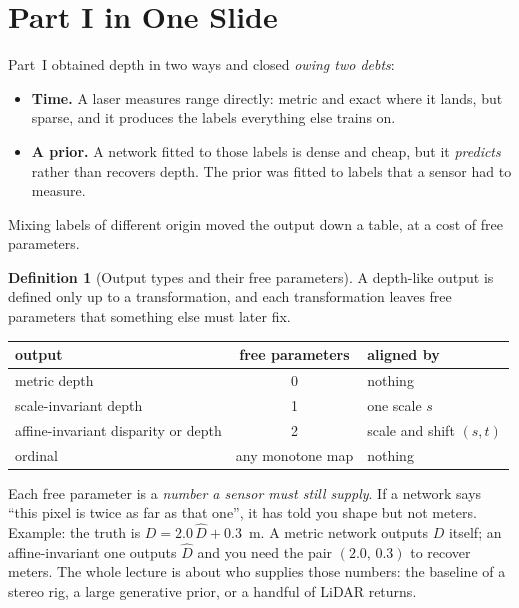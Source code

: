 \documentclass[11pt,a4paper]{article}
\theoremstyle{definition}
\newtheorem{definition}{Definition}[section]
\theoremstyle{plain}
\theoremstyle{remark}
\begin{document}
\section*{Part I in One Slide }
Part~I obtained depth in two ways and closed \emph{owing two debts}:
\begin{itemize}[nosep]
  \item \textbf{Time.} A laser measures range directly: metric and exact where it lands, but sparse, and it produces the labels everything else trains on.
  \item \textbf{A prior.} A network fitted to those labels is dense and cheap, but it \emph{predicts} rather than recovers depth. The prior was fitted to labels that a sensor had to measure.
\end{itemize}
Mixing labels of different origin moved the output down a table, at a cost of free parameters.

\begin{definition}[Output types and their free parameters]
A depth-like output is defined only up to a transformation, and each transformation leaves free parameters that something else must later fix.
\begin{center}\small
\begin{tabular}{@{}lcl@{}}\toprule
output & free parameters & aligned by\\\midrule
metric depth & 0 & nothing\\
scale-invariant depth & 1 & one scale $s$\\
affine-invariant disparity or depth & 2 & scale and shift $(s,t)$\\
ordinal & any monotone map & nothing\\\bottomrule
\end{tabular}
\end{center}
\end{definition}

\begin{intuition}
Each free parameter is a \emph{number a sensor must still supply}. If a network says ``this pixel is twice as far as that one'', it has told you shape but not meters. Example: the truth is $D=2.0\,\hat D+0.3$~m. A metric network outputs $D$ itself; an affine-invariant one outputs $\hat D$ and you need the pair $(2.0,\,0.3)$ to recover meters. The whole lecture is about who supplies those numbers: the baseline of a stereo rig, a large generative prior, or a handful of LiDAR returns.
\end{intuition}
\end{document}
